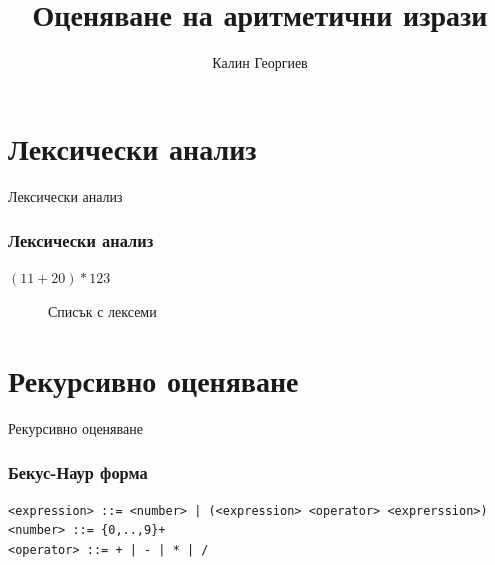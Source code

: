 \documentclass{beamer}
\begin{document}
\title[Структури от данни и програмиране]{Оценяване на аритметични изрази} 
\author{Калин Георгиев} 
\frame{\titlepage} 

\section{Лексически анализ} 


\begin{frame}
\centerline{Лексически анализ}
\end{frame}

\begin{frame}[fragile]
\frametitle{Лексически анализ}

\begin{center}
  $(11+20)*123$
\end{center}


\begin{figure}
  \centering

  \caption{Списък с лексеми}
  \label{fig:tokenlist}
\end{figure}


\end{frame}


\section{Рекурсивно оценяване} 


\begin{frame}
\centerline{Рекурсивно оценяване}
\end{frame}

\begin{frame}[fragile]
\frametitle{Бекус-Наур форма}
\begin{verbatim}
<expression> ::= <number> | (<expression> <operator> <exprerssion>)
<number> ::= {0,..,9}+
<operator> ::= + | - | * | /

\end{verbatim}

\end{frame}
\end{document}
